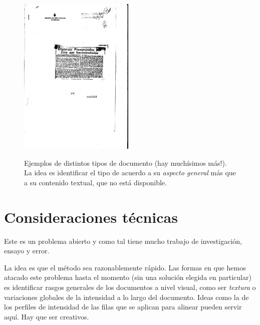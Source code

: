 \documentclass[11pt,a4paper]{article}
\begin{document}
\begin{figure}
\includegraphics[width=0.49\textwidth]{r0566_0121.jpg}\\
\caption{\label{fig:docs}Ejemplos de distintos tipos de documento (hay muchísimos más!). La idea es identificar el tipo de acuerdo a su \emph{aspecto general} más que a su contenido textual, que no está disponible.}
\end{figure}

\section{Consideraciones técnicas}

Este es un problema abierto y como tal tiene mucho trabajo de investigación, ensayo y error.

La idea es que el método sea razonablemente rápido. Las formas en que hemos atacado este problema hasta el momento (sin una solución elegida en particular) es identificar rasgos generales de los documentos a nivel visual, como ser \emph{textura} o variaciones globales de la intensidad a lo largo del documento. Ideas como la de los perfiles de intensidad de las filas que se aplican para alinear pueden servir aquí. Hay que ser creativos.
\end{document}
